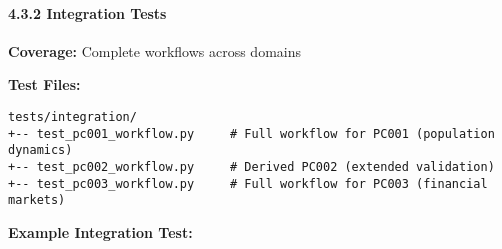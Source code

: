\documentclass[
]{article}
\begin{document}
\paragraph{4.3.2 Integration Tests}\label{integration-tests}

\textbf{Coverage:} Complete workflows across domains

\textbf{Test Files:}

\begin{verbatim}
tests/integration/
+-- test_pc001_workflow.py     # Full workflow for PC001 (population dynamics)
+-- test_pc002_workflow.py     # Derived PC002 (extended validation)
+-- test_pc003_workflow.py     # Full workflow for PC003 (financial markets)
\end{verbatim}

\textbf{Example Integration Test:}
\end{document}
